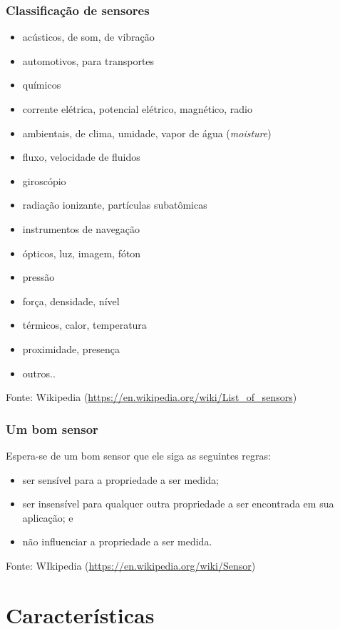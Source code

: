 \documentclass[t]{beamer}
\begin{document}
\begin{frame}
	\frametitle{Classificação de sensores}
		\begin{itemize}
			\item acústicos, de som, de vibração
			\item automotivos, para transportes
			\item químicos
			\item corrente elétrica, potencial elétrico, magnético, radio
			\item ambientais, de clima, umidade, vapor de água (\textit{moisture})
			\item fluxo, velocidade de fluidos
			\item giroscópio
			\item radiação ionizante, partículas subatômicas
			\item instrumentos de navegação
			\item ópticos, luz, imagem, fóton
			\item pressão
			\item força, densidade, nível
			\item térmicos, calor, temperatura
			\item proximidade, presença
			\item outros..
		\end{itemize}
		{\scriptsize Fonte: Wikipedia (\url{https://en.wikipedia.org/wiki/List_of_sensors})}
\end{frame}

\begin{frame}
	\frametitle{Um bom sensor}
	Espera-se de um bom sensor que ele siga as seguintes regras:
	\begin{itemize}
		\item ser sensível para a propriedade a ser medida;
		\item ser insensível para qualquer outra propriedade  a ser encontrada em sua aplicação; e
		\item não influenciar a propriedade a ser medida.
	\end{itemize}
	{\scriptsize Fonte: WIkipedia (\url{https://en.wikipedia.org/wiki/Sensor})}
\end{frame}

\section{Características}
\end{document}
